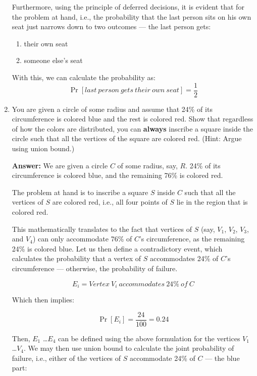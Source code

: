 \documentclass[11pt]{article}
\begin{document}
\begin{enumerate}
Furthermore, using the principle of deferred decisions, it is evident that for the problem at hand, i.e., the probability that the last person sits on his own seat just narrows down to two outcomes --- the last person gets:

\begin{enumerate}
    \item their own seat
    \item someone else's seat
\end{enumerate}

With this, we can calculate the probability as:
\[\Pr[last\ person\ gets\ their\ own\ seat] = \frac{1}{2}\]

\item You are given a circle of some radius and assume that 24\% of its circumference is colored blue
and the rest is colored red.  Show that regardless of how the colors are distributed, you can \textbf{always}  inscribe a square inside the circle such that
all the vertices of the square are colored red.  (Hint: Argue using union bound.)

    \textbf{Answer:}
    We are given a circle \(C\) of some radius, say, \(R\). 24\% of its circumference is colored blue, and the remaining 76\% is colored red.

    The problem at hand is to inscribe a square \(S\) inside \(C\) such that all the vertices of \(S\) are colored red, i.e., all four points of \(S\) lie in the region that is colored red.

    This mathematically translates to the fact that vertices of \(S\) (say, \(V_1\), \(V_2\), \(V_3\), and \(V_4\)) can only accommodate 76\% of \(C\)'s circumference, as the remaining 24\% is colored blue. Let us then define a contradictory event, which calculates the probability that a vertex of \(S\) accommodates 24\% of \(C\)'s circumference --- otherwise, the probability of failure.

        \[
            E_i = Vertex \ V_i \ accommodates \ 24\% \ of \ C
        \]

    Which then implies:

        \[
            \Pr[E_i] = \frac{24}{100} = 0.24
        \]

    Then, \(E_1\) \dots \(E_4\) can be defined using the above formulation for the vertices \(V_1\) \dots \(V_4\). We may then use union bound to calculate the joint probability of failure, i.e., either of the vertices of \(S\) accommodate 24\% of \(C\) --- the blue part:


\end{enumerate}
\end{document}
